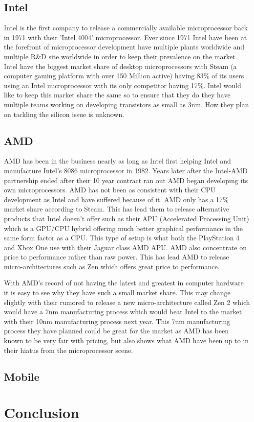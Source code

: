 \documentclass[journal]{IEEEtran}
\begin{document}
\subsection{Intel}
Intel is the first company to release a commercially available microprocessor back in 1971 with their 'Intel 4004' microprocessor. Ever since 1971 Intel have been at the forefront of microprocessor development have multiple plants worldwide and multiple R\&D site worldwide in order to keep their prevalence on the market. Intel have the biggest market share of desktop microprocessors with Steam (a computer gaming platform with over 150 Million active) having 83\% of its users using an Intel microprocessor with its only competitor having 17\%. Intel would like to keep this market share the same so to ensure that they do they have multiple teams working on developing transistors as small as 3nm. How they plan on tackling the silicon issue is unknown.

\subsection{AMD}
AMD has been in the business nearly as long as Intel first helping Intel and manufacture Intel's 8086 microprocessor in 1982. Years later after the Intel-AMD partnership ended after their 10 year contract ran out AMD began developing its own microprocessors. AMD has not been as consistent with their CPU development as Intel and have suffered because of it. AMD only has a 17\% market share according to Steam. This has lead them to release alternative products that Intel doesn't offer such as their APU (Accelerated Processing Unit) which is a GPU/CPU hybrid offering much better graphical performance in the same form factor as a CPU. This type of setup is what both the PlayStation 4 and Xbox One use with their Jaguar class AMD APU. AMD also concentrate on price to performance rather than raw power. This has lead AMD to release micro-architectures such as Zen which offers great price to performance.

With AMD's record of not having the latest and greatest in computer hardware it is easy to see why they have such a small market share. This may change slightly with their rumored to release a new micro-architecture called Zen 2 which would have a 7nm manufacturing process which would beat Intel to the market with their 10nm manufacturing process next year. This 7nm manufacturing process they have planned could be great for the market as AMD has been known to be very fair with pricing, but also shows what AMD have been up to in their hiatus from the microprocessor scene.

\subsection{Mobile}

\section{Conclusion}


\printbibliography
\end{document}
